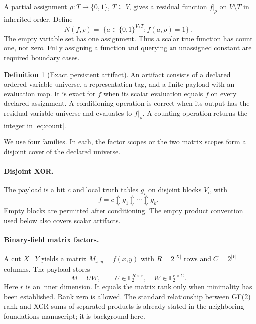 \documentclass[11pt]{article}
\newcommand{\F}{\mathbb F_2}
\newcommand{\B}{\{0,1\}}
\newcommand{\xor}{\mathbin{\Updownarrow}}
\theoremstyle{definition}\newtheorem{definition}[theorem]{Definition}
\theoremstyle{remark}\newtheorem{remark}[theorem]{Remark}
\begin{document}
A partial assignment $\rho:T\to\B$, $T\subseteq V$, gives a residual function $f|_\rho$ on $V\setminus T$ in inherited order. Define
\begin{equation}
 N(f,\rho)=\bigl|\{a\in\B^{V\setminus T}:f(a,\rho)=1\}\bigr|.
 \label{eq:count}
\end{equation}
The empty variable set has one assignment. Thus a scalar true function has count one, not zero. Fully assigning a function and querying an unassigned constant are required boundary cases.

\begin{definition}[Exact persistent artifact]
An artifact consists of a declared ordered variable universe, a representation tag, and a finite payload with an evaluation map. It is exact for $f$ when its scalar evaluation equals $f$ on every declared assignment. A conditioning operation is correct when its output has the residual variable universe and evaluates to $f|_\rho$. A counting operation returns the integer in \eqref{eq:count}.
\end{definition}

We use four families. In each, the factor scopes or the two matrix scopes form a disjoint cover of the declared universe.

\paragraph{Disjoint XOR.}
The payload is a bit $c$ and local truth tables $g_i$ on disjoint blocks $V_i$, with
\begin{equation}
 f=c\xor g_1\xor\cdots\xor g_k.
 \label{eq:xor}
\end{equation}
Empty blocks are permitted after conditioning. The empty product convention used below also covers scalar artifacts.

\paragraph{Binary-field matrix factors.}
A cut $X\mid Y$ yields a matrix $M_{x,y}=f(x,y)$ with $R=2^{|X|}$ rows and $C=2^{|Y|}$ columns. The payload stores
\begin{equation}
 M=UW,\qquad U\in\F^{R\times r},\quad W\in\F^{r\times C}.
 \label{eq:rankfactor}
\end{equation}
Here $r$ is an inner dimension. It equals the matrix rank only when minimality has been established. Rank zero is allowed. The standard relationship between GF(2) rank and XOR sums of separated products is already stated in the neighboring foundations manuscript\cite{foundations}; it is background here.
\end{document}
